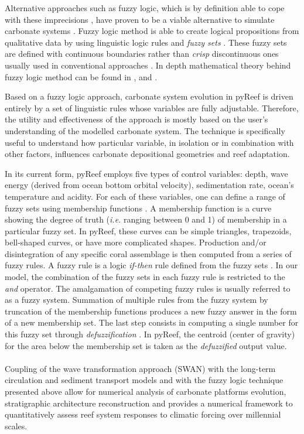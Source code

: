 \documentclass[default,jgrga]{agutex2015}
\begin{document}
\begin{article}
Alternative approaches such as fuzzy logic, which is by definition able to cope with these imprecisions \citep{Demicco01, Collin15}, have proven to be a viable alternative to simulate carbonate systems \citep{Salles11, Hattab13}. Fuzzy logic method is able to create logical propositions from qualitative data by using linguistic logic rules and \textit{fuzzy sets} \citep{Nordlund96}. These fuzzy sets are defined with continuous boundaries rather than \textit{crisp} discontinuous ones usually used in conventional approaches \citep{Meesters98}. In depth mathematical theory behind fuzzy logic method can be found in \citet{Zadeh65}, \citet{Zimmerman91} and \citet{Berkan97}.

\noindent Based on a fuzzy logic approach, carbonate system evolution in pyReef is driven entirely by a set of linguistic rules whose variables are fully adjustable. Therefore, the utility and effectiveness of the approach is mostly based on the user's understanding of the modelled carbonate system. The technique is specifically useful to understand how particular variable, in isolation or in combination with other factors, influences carbonate depositional geometries and reef adaptation.

In its current form, pyReef employs five types of control variables: depth, wave energy (derived from ocean bottom orbital velocity), sedimentation rate, ocean's temperature and acidity. For each of these variables, one can define a range of fuzzy sets using membership functions \citep{Nordlund99}. A membership function is a curve showing the degree of truth (\textit{i.e.} ranging between 0 and 1) of membership in a particular fuzzy set. In pyReef, these curves can be simple triangles, trapezoids, bell-shaped curves, or have more complicated shapes. Production and/or disintegration of any specific coral assemblage is then computed from a series of fuzzy rules. A fuzzy rule is a logic \textit{if-then} rule defined from the fuzzy sets \citep{Demicco01}. In our model, the combination of the fuzzy sets in each fuzzy rule is restricted to the \textit{and} operator. The amalgamation of competing fuzzy rules is usually referred to as a fuzzy system. Summation of multiple rules from the fuzzy system by truncation of the membership functions produces a new fuzzy answer in the form of a new membership set. The last step consists in computing a single number for this fuzzy set through \textit{defuzzification} \citep{Zadeh65}. In pyReef, the centroid (center of gravity) for the area below the membership set is taken as the \textit{defuzzified} output value.
\\
\\
Coupling of the wave transformation approach (SWAN) with the long-term circulation and sediment transport models and with the fuzzy logic technique presented above allow for numerical analysis of carbonate platforms evolution, stratigraphic architecture reconstruction and provides a numerical framework to quantitatively assess reef system responses to climatic forcing over millennial scales.


\end{article}
\end{document}
